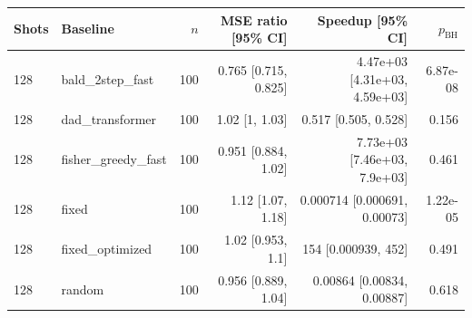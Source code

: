 \begin{tabular}{llrrrr}
\toprule
Shots & Baseline & $n$ & MSE ratio [95\% CI] & Speedup [95\% CI] & $p_{\mathrm{BH}}$ \\
\midrule
128 & bald\_2step\_fast & 100 & 0.765 [0.715, 0.825] & 4.47e+03 [4.31e+03, 4.59e+03] & 6.87e-08 \\
128 & dad\_transformer & 100 & 1.02 [1, 1.03] & 0.517 [0.505, 0.528] & 0.156 \\
128 & fisher\_greedy\_fast & 100 & 0.951 [0.884, 1.02] & 7.73e+03 [7.46e+03, 7.9e+03] & 0.461 \\
128 & fixed & 100 & 1.12 [1.07, 1.18] & 0.000714 [0.000691, 0.00073] & 1.22e-05 \\
128 & fixed\_optimized & 100 & 1.02 [0.953, 1.1] & 154 [0.000939, 452] & 0.491 \\
128 & random & 100 & 0.956 [0.889, 1.04] & 0.00864 [0.00834, 0.00887] & 0.618 \\
\bottomrule
\end{tabular}
